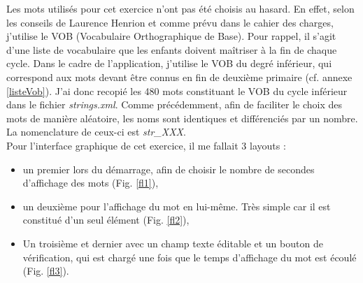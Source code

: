 Les mots utilisés pour cet exercice n'ont pas été choisis au hasard. En effet, selon les conseils de Laurence Henrion et comme prévu dans le cahier des charges, j'utilise le VOB (Vocabulaire Orthographique de Base). Pour rappel, il s'agit d'une liste de vocabulaire que les enfants doivent maîtriser à la fin de chaque cycle. Dans le cadre de l'application, j'utilise le VOB du degré inférieur, qui correspond aux mots devant être connus en fin de deuxième primaire (cf. annexe \ref{listeVob}). J'ai donc recopié les 480 mots constituant le VOB du cycle inférieur dans le fichier \textit{strings.xml}. Comme précédemment, afin de faciliter le choix des mots de manière aléatoire, les noms sont identiques et différenciés par un nombre. La nomenclature de ceux-ci est \textit{str\_XXX}. \\

Pour l'interface graphique de cet exercice, il me fallait 3 layouts :
\begin{itemize}
\item un premier lors du démarrage, afin de choisir le nombre de secondes d'affichage des mots (Fig. \ref{fl1}),
\item un deuxième pour l'affichage du mot en lui-même. Très simple car il est constitué d'un seul élément (Fig. \ref{fl2}),
\item Un troisième et dernier avec un champ texte éditable et un bouton de vérification, qui est chargé une fois que le temps d'affichage du mot est écoulé (Fig. \ref{fl3}).\\
\end{itemize}

